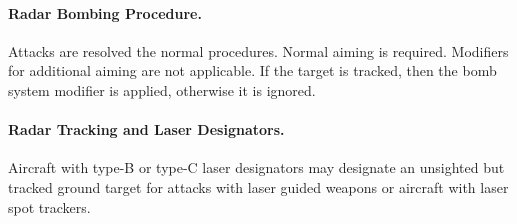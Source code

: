 \begin{advancedrules}
{\paragraph{Radar Bombing Procedure.} Attacks are resolved the normal procedures. Normal aiming is required. Modifiers for additional aiming are not applicable. If the target is tracked, then the bomb system modifier is applied, otherwise it is ignored. 

\paragraph{Radar Tracking and Laser Designators.} Aircraft with type-B or type-C laser designators may designate an unsighted but tracked ground target for attacks with laser guided weapons or aircraft with laser spot trackers.


}



\end{advancedrules}

